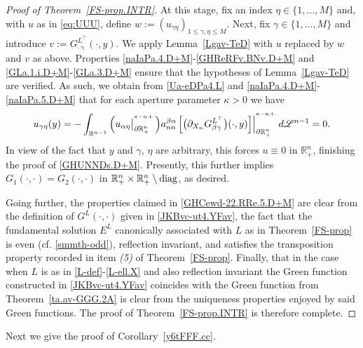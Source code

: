 \documentclass[11pt,reqno]{amsart}
\numberwithin{equation}{section}
\theoremstyle{remark}
\begin{document}
\begin{proof}[Proof of Theorem~\ref{FS-prop.INTR}]
At this stage, fix an index $\eta\in\{1,\dots,M\}$ and, with $u$ as in \eqref{eq:UUU}, define $w:=(u_{\gamma\eta})_{1\leq\gamma,\eta\leq M}$. 
Next, fix $\gamma\in\{1,\dots,M\}$ and introduce $v:=G^{L^\top}_{\cdot\,\gamma}(\cdot,y)$. 
We apply Lemma~\ref{Lgav-TeD} with $u$ replaced by $w$ and $v$ as above. 
Properties \eqref{naIaPa.4.D+M}-\eqref{GHReRFv.BNv.D+M} and \eqref{GLa.1.i.D+M}-\eqref{GLa.3.D+M} 
ensure that the hypotheses of Lemma~\ref{Lgav-TeD} are verified. As such, we obtain
from \eqref{Ua-eDPa4.L} and \eqref{naIaPa.4.D+M}-\eqref{naIaPa.5.D+M} that for each aperture parameter $\kappa>0$ we have
%
\begin{equation}\label{Ua-eDPaVVV.D+M}
u_{\gamma\eta}(y)=-\int_{\mathbb{R}^{n-1}}
\Big(u_{\alpha\eta}\big|_{\partial\mathbb{R}^{n}_{+}}^{{}^{\kappa-{\rm n.t.}}}\Big)a^{\beta\alpha}_{nn}\,
\Big[\big(\partial_{X_n} G^{L^\top}_{\beta\gamma}\big)(\cdot,y)
\Big]\Big|_{\partial\mathbb{R}^{n}_{+}}^{{}^{\kappa-{\rm n.t.}}}\,d{\mathscr{L}}^{n-1}=0.
\end{equation}
%
In view of the fact that $y$ and $\gamma$, $\eta$ are arbitrary, this forces $u\equiv 0$ in ${\mathbb{R}}^n_{+}$, 
finishing the proof of \eqref{GHUNNDs.D+M}. Presently, this further implies $G_1(\cdot,\cdot)=G_2(\cdot,\cdot)$ in 
${\mathbb{R}}^n_{+}\times{\mathbb{R}}^n_{+}\setminus{\rm diag}$, as desired.

Going further, the properties claimed in \eqref{GHCewd-22.RRe.5.D+M} are clear from 
the definition of $G^L(\cdot,\cdot)$ given in \eqref{JKBvc-ut4.YFav}, the fact that the fundamental solution 
$E^L$ canonically associated with $L$ as in Theorem~\ref{FS-prop} is even (cf. \eqref{smmth-odd}), 
reflection invariant, and satisfies the transposition property recorded in item {\it (5)} of Theorem~\ref{FS-prop}.
Finally, that in the case when $L$ is as in \eqref{L-def}-\eqref{L-ell.X} and also reflection invariant the Green function 
constructed in \eqref{JKBvc-ut4.YFav} coincides with the Green function from Theorem~\ref{ta.av-GGG.2A} is clear from the 
uniqueness properties enjoyed by said Green functions. The proof of Theorem~\ref{FS-prop.INTR} is therefore complete. 
\end{proof}


Next we give the proof of Corollary~\ref{y6tFFF.cc}.
\end{document}
